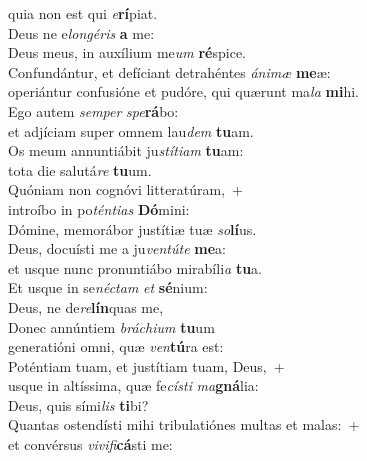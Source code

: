 \evenverse quia non est qui \textit{e}\textbf{rí}piat.\\
\oddverse Deus ne e\textit{lon}\textit{gé}\textit{ris} \textbf{a} me:~\*\\
\oddverse Deus meus, in auxílium me\textit{um} \textbf{ré}spice.\\
\evenverse Confundántur, et defíciant detrahéntes \textit{á}\textit{ni}\textit{mæ} \textbf{me}æ:~\*\\
\evenverse operiántur confusióne et pudóre, qui quærunt ma\textit{la} \textbf{mi}hi.\\
\oddverse Ego autem \textit{sem}\textit{per} \textit{spe}\textbf{rá}bo:~\*\\
\oddverse et adjíciam super omnem lau\textit{dem} \textbf{tu}am.\\
\evenverse Os meum annuntiábit ju\textit{stí}\textit{ti}\textit{am} \textbf{tu}am:~\*\\
\evenverse tota die salutá\textit{re} \textbf{tu}um.\\
\oddverse Quóniam non cognóvi litteratúram,~+\\
\oddverse  introíbo in po\textit{tén}\textit{ti}\textit{as} \textbf{Dó}mini:~\*\\
\oddverse Dómine, memorábor justítiæ tuæ \textit{so}\textbf{lí}us.\\
\evenverse Deus, docuísti me a ju\textit{ven}\textit{tú}\textit{te} \textbf{me}a:~\*\\
\evenverse et usque nunc pronuntiábo mirabíli\textit{a} \textbf{tu}a.\\
\oddverse Et usque in se\textit{né}\textit{ctam} \textit{et} \textbf{sé}nium:~\*\\
\oddverse Deus, ne de\textit{re}\textbf{lín}quas me,\\
\evenverse Donec annúntiem \textit{brá}\textit{chi}\textit{um} \textbf{tu}um~\*\\
\evenverse generatióni omni, quæ \textit{ven}\textbf{tú}ra est:\\
\oddverse Poténtiam tuam, et justítiam tuam, Deus,~+\\
\oddverse  usque in altíssima, quæ fe\textit{cí}\textit{sti} \textit{ma}\textbf{gná}lia:~\*\\
\oddverse Deus, quis sími\textit{lis} \textbf{ti}bi?\\
\evenverse Quantas ostendísti mihi tribulatiónes multas et malas:~+\\
\evenverse  et convérsus \textit{vi}\textit{vi}\textit{fi}\textbf{cá}sti me:~\*\\
